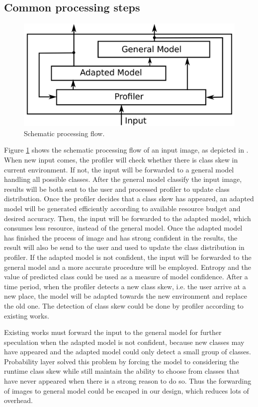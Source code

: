\documentclass[pageno]{jpaper}
\begin{document}
\subsection{Common processing steps}


\begin{figure}
  \includegraphics[scale=0.14]{profiler.png}
  \caption{Schematic processing flow.}
  \label{fig:profiler}
\end{figure}

Figure \ref{fig:profiler} shows the schematic processing flow of an input image, as depicted in . When new input comes, the profiler will check whether there is class skew in current environment. If not, the input will be forwarded to a general model handling all possible classes. After the general model classify the input image, results will be both sent to the user and processed profiler to update class distribution. Once the profiler decides that a class skew has appeared, an adapted model will be generated efficiently according to available resource budget and desired accuracy. Then, the input will be forwarded to the adapted model, which consumes less resource, instead of the general model. Once the adapted model has finished the process of image and has strong confident in the results, the result will also be send to the user and used to update the class distribution in profiler. If the adapted model is not confident, the input will be forwarded to the general model and a more accurate procedure will be employed. Entropy and the value of predicted class could be used as a measure of model confidence. After a time period, when the profiler detects a new class skew, i.e. the user arrive at a new place, the model will be adapted towards the new environment and replace the old one. The detection of class skew could be done by profiler according to existing works. 

Existing works must forward the input to the general model for further speculation when the adapted model is not confident, because new classes may have appeared and the adapted model could only detect a small group of classes. Probability layer solved this problem by forcing the model to considering the runtime class skew while still maintain the ability to choose from classes that have never appeared when there is a strong reason to do so. Thus the forwarding of images to general model could be escaped in our design, which reduces lots of overhead.
\end{document}
